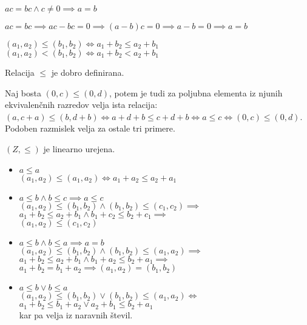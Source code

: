 \begin{trditev}
    $ac = bc \wedge c \neq 0 \implies a = b$
\end{trditev}
\begin{dokaz}
    $ac = bc \implies ac - bc = 0 \implies (a - b)c = 0 \implies a - b = 0 \implies a = b$
\end{dokaz}

\begin{definicija}
    $(a_1, a_2) \leq (b_1, b_2) \iff a_1 + b_2 \leq a_2 + b_1$ \\
    $(a_1, a_2) < (b_1, b_2) \iff a_1 + b_2 < a_2 + b_1$
\end{definicija}

\begin{trditev}
    Relacija $\leq$ je dobro definirana.
\end{trditev}
\begin{dokaz}
    Naj bosta $(0, c) \leq (0, d)$, potem je tudi za poljubna elementa iz njunih ekvivalenčnih razredov velja ista relacija: \\
    $(a, c + a) \leq (b, d + b) \iff a + d + b \leq c + d + b \iff a \leq c \iff (0, c) \leq (0, d)$.\\
    Podoben razmislek velja za ostale tri primere.
\end{dokaz}

\begin{trditev}
    $(Z, \leq)$ je linearno urejena.
\end{trditev}
\begin{dokaz}
    \begin{itemize}
        \item $a \leq a$ \\
        $(a_1, a_2) \leq (a_1, a_2) \iff a_1 + a_2 \leq a_2 + a_1$
        \item $a \leq b \wedge b \leq c \implies a \leq c$ \\
        $(a_1, a_2) \leq (b_1, b_2) \wedge (b_1, b_2) \leq (c_1, c_2) \implies$\\
        $a_1 + b_2 \leq a_2 + b_1 \wedge b_1 + c_2 \leq b_2 + c_1 \implies$\\
        $(a_1, a_2) \leq (c_1, c_2)$
        \item $a \leq b \wedge b \leq a \implies a = b$ \\
        $(a_1, a_2) \leq (b_1, b_2) \wedge (b_1, b_2) \leq (a_1, a_2) \implies$ \\
        $a_1 + b_2 \leq a_2 + b_1 \wedge b_1 + a_2 \leq b_2 + a_1 \implies$ \\
        $a_1 + b_2 = b_1 + a_2 \implies (a_1, a_2) = (b_1, b_2)$
        \item $a \leq b \vee b \leq a$ \\
        $(a_1, a_2) \leq (b_1, b_2) \vee (b_1, b_2) \leq (a_1, a_2) \iff$ \\
        $a_1 + b_2 \leq b_1 + a_2 \vee a_2 + b_1 \leq b_2 + a_1$ \\
        kar pa velja iz naravnih števil.
    \end{itemize}
\end{dokaz}

